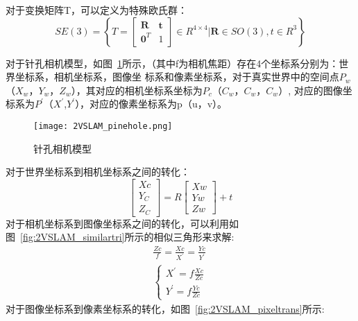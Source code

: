 对于变换矩阵T，可以定义为特殊欧氏群：
\begin{equation}
S E(3)=\left\{T=\left[\begin{array}{cc}{\mathbf{R}} & {\mathbf{t}} \\ {\mathbf{0}^{T}} & {1}\end{array}\right] \in R^{4 \times 4} | \mathbf{R} \in S O(3), t \in R^{3}\right\}
\end{equation}

对于针孔相机模型，如图~\ref{fig:2VSLAM_pinehole}所示，（其中f为相机焦距）存在4个坐标系分别为：世界坐标系，相机坐标系，图像坐
标系和像素坐标系，对于真实世界中的空间点$P_w$（$X_w$，$Y_w$，$Z_w$），其对应的相机坐标系坐标为$P_c$（$C_w$，$C_w$，$C_w$）,
对应的图像坐标系为$P^{'}$（$X^{'}$,$Y^{'}$），对应的像素坐标系为p（u，v）。
\begin{figure}[H] %
  \centering
  \texttt{[image: 2VSLAM\_pinehole.png]}
  \caption{针孔相机模型}
  \label{fig:2VSLAM_pinehole}
\end{figure}
对于世界坐标系到相机坐标系之间的转化：
\begin{equation}
  \left[\begin{array}{l}{X c} \\ {Y_{C}} \\ {Z_{C}}\end{array}\right]=R\left[\begin{array}{l}{X w} \\ {Y w} \\ {Z w}\end{array}\right]+t
  \label{equ:world2cam}
\end{equation}
对于相机坐标系到图像坐标系之间的转化，可以利用如图~\ref{fig:2VSLAM_similartri}所示的相似三角形来求解:
\begin{equation}
  \begin{split}
    \frac{Z c}{f}=\frac{X c}{X^{'}}=\frac{Y c}{Y^{'}}\\
    \left\{\begin{array}{l}{X^{\prime}=f \frac{X c}{Z c}} \\ {Y^{\prime}=f \frac{Y c}{Z c}}\end{array}\right.
\end{split}
\label{equ:cam2photo}
\end{equation}
对于图像坐标系到像素坐标系的转化，如图~\ref{fig:2VSLAM_pixeltrans}所示:

